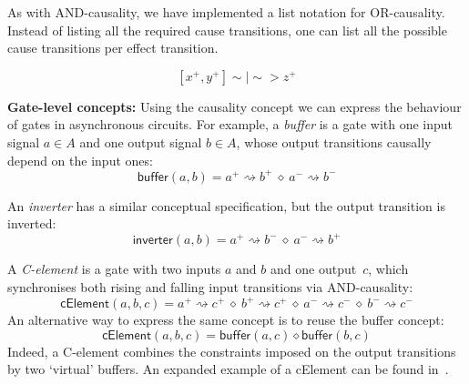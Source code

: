 \documentclass[british, journal]{IEEEtran}
\begin{document}
As with AND-causality, we have implemented a list notation for OR-causality. Instead of listing
all the required cause transitions, one can list all the possible cause transitions per effect transition.

\[
[x^{+}, y^{+}]\sim|\sim>z^{+}
\]

\textbf{Gate-level concepts:} Using the causality concept we can express
the behaviour of gates in asynchronous circuits. For example, a \emph{buffer}
is a gate with one input signal $a\in A$ and one output signal $b\in A$,
whose output transitions causally depend on the input ones:
\[
\mathsf{buffer}(a, b)=a^{+}\rightsquigarrow b^{+}\ \diamond\
a^{-}\rightsquigarrow b^{-}
\]

An \emph{inverter} has a similar conceptual specification, but the
output transition is inverted:
\[
\mathsf{inverter}(a, b)=a^{+}\rightsquigarrow b^{-}\ \diamond\
a^{-}\rightsquigarrow b^{+}
\]


A \emph{C-element} is a gate with two inputs $a$ and $b$ and one
output~$c$, which synchronises both rising and falling input transitions
via AND-causality:
\[
\mathsf{cElement}(a, b, c)=a^{+}\!\rightsquigarrow\! c^{+}\ \diamond\
b^{+}\!\rightsquigarrow\! c^{+}\ \diamond\ a^{-}\!\rightsquigarrow\! c^{-}\
\diamond\ b^{-}\!\rightsquigarrow\! c^{-}
\]
An alternative way to express the same concept is to reuse the buffer concept:
\[
\mathsf{cElement}(a, b, c)=\mathsf{buffer}(a, c) \diamond \mathsf{buffer}(b, c)
\]
Indeed, a C-element combines the constraints imposed on the output
transitions by two `virtual' buffers. An expanded example of a cElement can be
found in~\cite{2015_Beaumont_MEMOCODE}.
\end{document}
